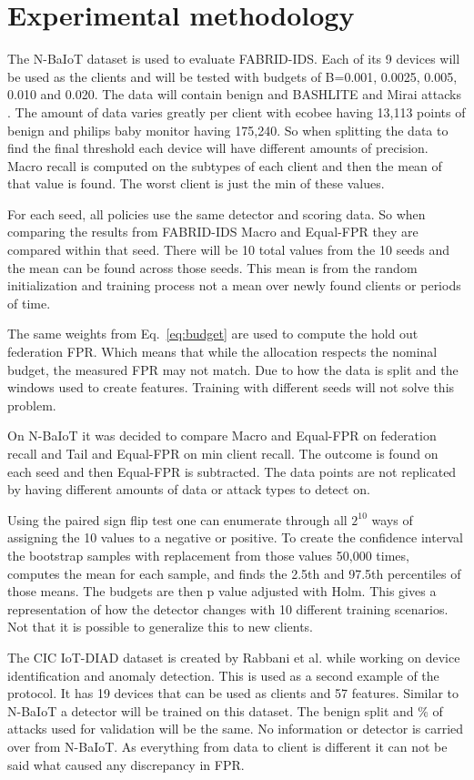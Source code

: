 \documentclass[pdflatex,sn-mathphys-num]{sn-jnl}
\begin{document}
\section{Experimental methodology}\label{sec:experiments}
The N-BaIoT dataset is used to evaluate FABRID-IDS. Each of its 9 devices will be used as the clients and will be tested with budgets of B=0.001, 0.0025, 0.005, 0.010 and 0.020. The data will contain benign and BASHLITE and Mirai attacks \cite{meidan2018nbaiot}. The amount of data varies greatly per client with ecobee having 13,113 points of benign and philips baby monitor having 175,240. So when splitting the data to find the final threshold each device will have different amounts of precision. Macro recall is computed on the subtypes of each client and then the mean of that value is found. The worst client is just the min of these values.

For each seed, all policies use the same detector and scoring data. So when comparing the results from FABRID-IDS Macro and Equal-FPR they are compared within that seed. There will be 10 total values from the 10 seeds and the mean can be found across those seeds. This mean is from the random initialization and training process not a mean over newly found clients or periods of time.

The same weights from Eq.~\ref{eq:budget} are used to compute the hold out federation FPR. Which means that while the allocation respects the nominal budget, the measured FPR may not match. Due to how the data is split and the windows used to create features. Training with different seeds will not solve this problem.

On N-BaIoT it was decided to compare Macro and Equal-FPR on federation recall and Tail and Equal-FPR on min client recall. The outcome is found on each seed and then Equal-FPR is subtracted. The data points are not replicated by having different amounts of data or attack types to detect on.

Using the paired sign flip test one can enumerate through all $2^{10}$ ways of assigning the 10 values to a negative or positive. To create the confidence interval the bootstrap samples with replacement from those values 50,000 times, computes the mean for each sample, and finds the 2.5th and 97.5th percentiles of those means. The budgets are then p value adjusted with Holm. This gives a representation of how the detector changes with 10 different training scenarios. Not that it is possible to generalize this to new clients.

The CIC IoT-DIAD dataset is created by Rabbani et al. \cite{rabbani2025iotdiad} while working on device identification and anomaly detection. This is used as a second example of the protocol. It has 19 devices that can be used as clients and 57 features. Similar to N-BaIoT a detector will be trained on this dataset. The benign split and \% of attacks used for validation will be the same. No information or detector is carried over from N-BaIoT. As everything from data to client is different it can not be said what caused any discrepancy in FPR.
\end{document}

